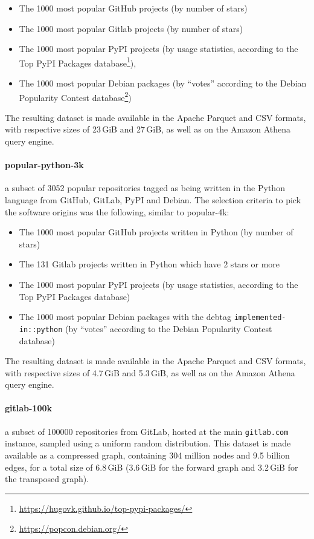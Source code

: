 \begin{itemize}
    \setlength\itemsep{0em}
    \item The 1000 most popular GitHub projects (by number of stars)
    \item The 1000 most popular Gitlab projects (by number of stars)
    \item The 1000 most popular PyPI projects (by usage statistics, according
        to the Top PyPI Packages
        database\footnote{\url{https://hugovk.github.io/top-pypi-packages/}}),
    \item The 1000 most popular Debian packages (by “votes” according to the
        Debian Popularity Contest
        database\footnote{\url{https://popcon.debian.org/}})
\end{itemize}

The resulting dataset is made available in the Apache Parquet and CSV formats,
with respective sizes of 23\,GiB and 27\,GiB, as well as on the Amazon Athena
query engine.

\paragraph{popular-python-3k} a subset of 3052 popular repositories tagged as
being written in the Python language from GitHub, GitLab, PyPI and Debian. The
selection criteria to pick the software origins was the following, similar to
popular-4k:

\begin{itemize}
    \setlength\itemsep{0em}
    \item The 1000 most popular GitHub projects written in Python (by number of
        stars)
    \item The 131 Gitlab projects written in Python which have 2 stars or more
    \item The 1000 most popular PyPI projects (by usage statistics, according
        to the Top PyPI Packages database)
    \item The 1000 most popular Debian packages with the debtag
        \texttt{implemented-in::python} (by “votes” according to the Debian
        Popularity Contest database)
\end{itemize}

The resulting dataset is made available in the Apache Parquet and CSV formats,
with respective sizes of 4.7\,GiB and 5.3\,GiB, as well as on the Amazon Athena
query engine.

\paragraph{gitlab-100k} a subset of \num{100000} repositories from GitLab,
hosted at the main \texttt{gitlab.com} instance, sampled using a uniform random
distribution. This dataset is made available as a compressed graph, containing
304 million nodes and 9.5 billion edges, for a total size of 6.8\,GiB (3.6\,GiB
for the forward graph and 3.2\,GiB for the transposed graph).

